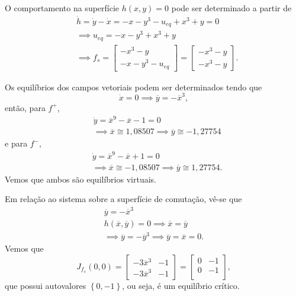 \documentclass[a4paper]{report}
\begin{document}
O comportamento na superfície $h(x,y)=0$ pode ser determinado a partir de
\begin{align*}
    &\dot{h} = \dot{y} - \dot{x} = -x -y^3 -u_{eq} + x^3 + y = 0 \\
    &\implies u_{eq} = -x -y^3 + x^3 + y \\
    &\implies f_s = \begin{bmatrix} 
	-x^3 -y \\
	-x -y^3 -u_{eq}
    \end{bmatrix} = \begin{bmatrix} 
	-x^3 -y \\
	-x^3 -y
\end{bmatrix} 
.\end{align*}

Os equilíbrios dos campos vetoriais podem ser determinados tendo que \[
    \dot{x} = 0 \implies \overline{y} = -\overline{x}^3
,\] então, para $f^{+}$,
\begin{align*}
    &\dot{y}  = \overline{x}^{9} - \overline{x} -1 = 0 \\
    &\implies \overline{x} \cong 1,08507 \implies \overline{y} \cong -1,27754
\end{align*}
e para $f^{-}$,
\begin{align*}
    &\dot{y}  = \overline{x}^{9} - \overline{x} +1 = 0 \\
    &\implies \overline{x} \cong -1,08507 \implies \overline{y} \cong 1,27754
.\end{align*}
Vemos que ambos são equilíbrios virtuais.

Em relação ao sistema sobre a superfície de comutação, vê-se que
\begin{align*}
    \overline{y} = -\overline{x}^3 \\
    h(\overline{x},\overline{y}) = 0 \implies \overline{x} = \overline{y} \\
    \implies \overline{y} = -\overline{y}^3 \implies \overline{y} = \overline{x} = 0
.\end{align*}
Vemos que \[
    J_{f_s}(0,0) = \begin{bmatrix} 
    -3\overline{x}^3 & -1 \\
    -3\overline{x}^3 & -1
\end{bmatrix} = \begin{bmatrix} 
    0 & -1 \\
    0 & -1 \\
\end{bmatrix}
,\] que possui autovalores $\left\{ 0, -1 \right\}$, ou seja, é um equilíbrio crítico.
\end{document}
